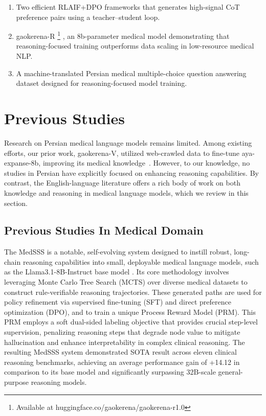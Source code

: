 \documentclass[conference]{IEEEtran}
\begin{document}
\begin{enumerate}
  \item Two efficient RLAIF+DPO frameworks that generates high-signal CoT preference pairs using a teacher–student loop.
  \item gaokerena-R
\footnote{Available at huggingface.co/gaokerena/gaokerena-r1.0}
, an 8b-parameter medical model demonstrating that reasoning-focused training outperforms data scaling in low-resource medical NLP.
  \item A machine-translated Persian medical multiple-choice question answering dataset designed for reasoning-focused model training.
\end{enumerate}

	
	\section{Previous Studies}
Research on Persian medical language models remains limited. Among existing efforts, our prior work, gaokerena-V, utilized web-crawled data to fine-tune aya-expanse-8b, improving its medical knowledge~\cite{b7}. 
However, to our knowledge, no studies in Persian have explicitly focused on enhancing reasoning capabilities. By contrast, the English-language literature offers a rich body of work on both knowledge and reasoning in medical language models, which we review in this section.



	\subsection{Previous Studies In Medical Domain}

The MedSSS \cite{b9} is a notable, self-evolving system designed to instill robust, long-chain reasoning capabilities into small, deployable medical language models, such as the Llama3.1-8B-Instruct base model \cite{b10}. Its core methodology involves leveraging Monte Carlo Tree Search (MCTS) \cite{b11} over diverse medical datasets to construct rule-verifiable reasoning trajectories. These generated paths are used for policy refinement via supervised fine-tuning (SFT) and direct preference optimization (DPO), and to train a unique Process Reward Model (PRM). This PRM employs a soft dual-sided labeling objective that provides crucial step-level supervision, penalizing reasoning steps that degrade node value to mitigate hallucination and enhance interpretability in complex clinical reasoning. The resulting MedSSS system demonstrated SOTA result across eleven clinical reasoning benchmarks, achieving an average performance gain of +14.12 in comparison to its base model and significantly surpassing 32B-scale general-purpose reasoning models.
\end{document}
